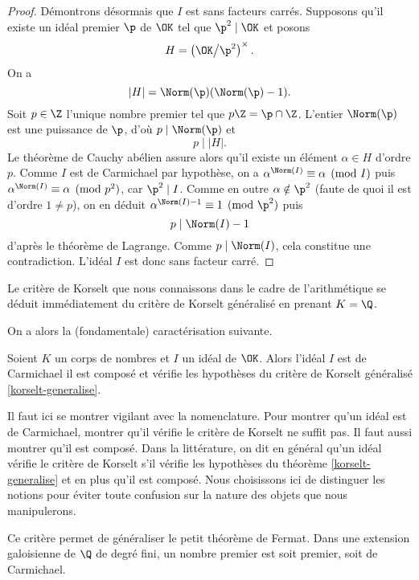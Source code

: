 \begin{proof}
	Démontrons désormais que $I$ est sans facteurs carrés. Supposons qu'il existe un idéal premier $\p$ de $\OK$ tel que $\p^2\mid \OK$ et posons \[H = \left(\OK\big/\p^2\right)^\times.\] On a \[\left|H\right| = \Norm(\p)(\Norm(\p) - 1).\] Soit $p\in \Z$ l'unique nombre premier tel que $p\Z = \p\cap \Z$. L'entier $\Norm(\p)$ est une puissance de $\p$, d'où $p\mid \Norm(\p)$ et \[p\mid \left| H \right|.\] Le théorème de Cauchy abélien assure alors qu'il existe un élément $\alpha \in H$ d'ordre $p$. Comme $I$ est de Carmichael par hypothèse, on a $\alpha^{\Norm(I)}\equiv \alpha \pmod{I}$ puis $\alpha^{\Norm(I)} \equiv \alpha \pmod{p^2}$, car $\p^2\mid I$. Comme en outre $\alpha\notin \p^2$ (faute de quoi il est d'ordre $1\neq p$), on en déduit $\alpha^{\Norm(I) - 1} \equiv 1 \pmod{\p^2}$ puis \[p \mid \Norm(I) - 1\] d'après le théorème de Lagrange. Comme $p\mid \Norm(I)$, cela constitue une contradiction. L'idéal $I$ est donc sans facteur carré.
\end{proof}

\begin{remarque}
	Le critère de Korselt que nous connaissons dans le cadre de l'arithmétique se déduit immédiatement du critère de Korselt généralisé en prenant $K=\Q$.
\end{remarque}

On a alors la (fondamentale) caractérisation suivante.

\begin{corollaire}\label{carac-korselt}
	Soient $K$ un corps de nombres et $I$ un idéal de $\OK$. Alors l'idéal $I$ est de Carmichael \ssi il est composé et vérifie les hypothèses du critère de Korselt généralisé \ref{korselt-generalise}.
\end{corollaire}

\begin{remarque}
	Il faut ici se montrer vigilant avec la nomenclature. Pour montrer qu'un idéal est de Carmichael, montrer qu'il vérifie le critère de Korselt ne suffit pas. Il faut aussi montrer qu'il est composé. Dans la littérature, on dit en général qu'un idéal vérifie le critère de Korselt s'il vérifie les hypothèses du théorème \ref{korselt-generalise} et en plus qu'il est composé. Nous choisissons ici de distinguer les notions pour éviter toute confusion sur la nature des objets que nous manipulerons.
\end{remarque}

Ce critère permet de généraliser le petit théorème de Fermat. Dans une extension galoisienne de $\Q$ de degré fini, un nombre premier est soit premier, soit de Carmichael.

